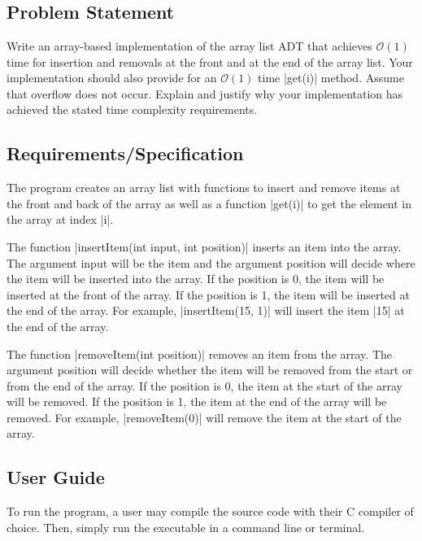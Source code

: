 \documentclass{report}
\begin{document}
\chapter{}
\section{Problem Statement}
Write an array-based implementation of the array list ADT that achieves \(\mathcal{O}(1)\) time for insertion and removals at the front and at the end of the array list. Your implementation should also provide for an \(\mathcal{O}(1)\) time |get(i)| method. Assume that overflow does not occur. Explain and justify why your implementation has achieved the stated time complexity requirements.
\section{Requirements/Specification}
The program creates an array list with functions to insert and remove items at the front and back of the array as well as a function |get(i)| to get the element in the array at index |i|.

The function |insertItem(int input, int position)| inserts an item into the array. The argument input will be the item and the argument position will decide where the item will be inserted into the array. If the position is 0, the item will be inserted at the front of the array. If the position is 1, the item will be inserted at the end of the array. For example, |insertItem(15, 1)| will insert the item |15| at the end of the array.

The function |removeItem(int position)| removes an item from the array. The argument position will decide whether the item will be removed from the start or from the end of the array. If the position is 0, the item at the start of the array will be removed. If the position is 1, the item at the end of the array will be removed. For example, |removeItem(0)| will remove the item at the start of the array.
\section{User Guide}
To run the program, a user may compile the source code with their C compiler of choice. Then, simply run the executable in a command line or terminal.
\end{document}
